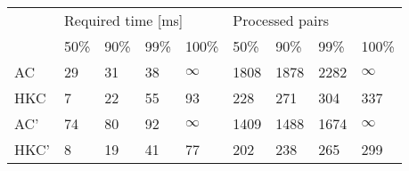 \begin{tabular}{l|llll|llll}
\multirow{2}{*}{} & \multicolumn{4}{l|}{Required time {[}ms{]}} & \multicolumn{4}{l}{Processed pairs} \\ \cline{2-9}
                  & 50\% & 90\%  & 99\% & 100\%                 & 50\%   & 90\%   & 99\%  & 100\%     \\ \hline
AC                & 29   & 31    & 38   & $\infty$              & 1808   & 1878   & 2282  & $\infty$  \\
HKC               & 7    & 22    & 55   & 93                    & 228    & 271    & 304   & 337       \\
AC'               & 74   & 80    & 92   & $\infty$              & 1409   & 1488   & 1674  & $\infty$  \\
HKC'              & 8    & 19    & 41   & 77                    & 202    & 238    & 265   & 299
\end{tabular}
